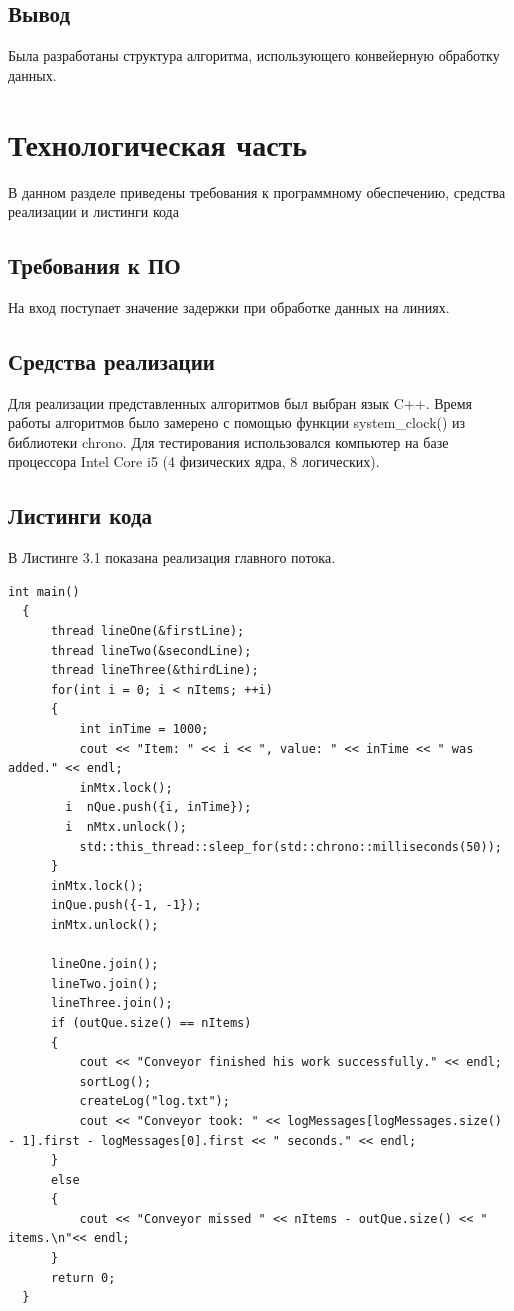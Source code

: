 \documentclass[a4paper,12pt]{report}
\begin{document}
\section{Вывод}
Была разработаны структура алгоритма, использующего конвейерную обработку данных.

\chapter{Технологическая часть}
\hspace{0.6cm}В данном разделе приведены требования к программному обеспечению, средства реализации и листинги кода
\section{Требования к ПО}

\hspace{0.6cm}На вход поступает значение задержки при обработке данных на линиях.
	
\section{Средства реализации}
\hspace{0.6cm}Для реализации представленных алгоритмов был выбран язык C++. Время работы алгоритмов было замерено с помощью функции system\_clock() из библиотеки chrono. Для тестирования использовался компьютер на базе процессора Intel Core i5 (4 физических ядра, 8 логических).

\section{Листинги кода}

\hspace{0.6cm}В Листинге 3.1 показана реализация главного потока.

\begin{lstlisting}[caption=Функция главного потока]
  int main()
  {
      thread lineOne(&firstLine);
      thread lineTwo(&secondLine);
      thread lineThree(&thirdLine);
      for(int i = 0; i < nItems; ++i)
      {
          int inTime = 1000;
          cout << "Item: " << i << ", value: " << inTime << " was added." << endl;
          inMtx.lock();
        i  nQue.push({i, inTime});
        i  nMtx.unlock();
          std::this_thread::sleep_for(std::chrono::milliseconds(50));
      }
      inMtx.lock();
      inQue.push({-1, -1});
      inMtx.unlock();
  
      lineOne.join();
      lineTwo.join();
      lineThree.join();
      if (outQue.size() == nItems)
      {
          cout << "Conveyor finished his work successfully." << endl;
          sortLog();
          createLog("log.txt");
          cout << "Conveyor took: " << logMessages[logMessages.size() - 1].first - logMessages[0].first << " seconds." << endl;
      }
      else
      {
          cout << "Conveyor missed " << nItems - outQue.size() << " items.\n"<< endl;
      }
      return 0;
  }
\end{lstlisting}
\end{document}

